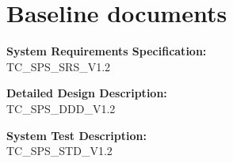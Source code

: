 \documentclass[Main]{subfiles}
\begin{document}
\chapter{Baseline documents}
\textbf{System Requirements Specification:}\\
TC\_SPS\_SRS\_V1.2


\textbf{Detailed Design Description:}\\
TC\_SPS\_DDD\_V1.2


\textbf{System Test Description:}\\
TC\_SPS\_STD\_V1.2
\end{document}
